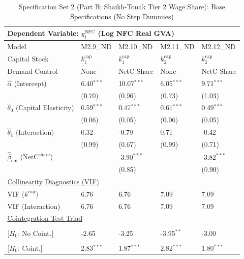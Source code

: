 \begin{table}[H]
\centering
\caption{Specification Set 2 (Part B: Shaikh-Tonak Tier 2 Wage Share): Base Specifications (No Step Dummies)}
\label{tab:spec_set_2_b_nd}
\scriptsize
\begin{tabular}{p{3.8cm}p{1.35cm}p{1.35cm}p{1.35cm}p{1.35cm}}
\toprule
\multicolumn{5}{l}{\textbf{Dependent Variable: $y_t^{\text{NFC}}$ (Log NFC Real GVA)}} \\
\midrule
Model & M2.9\_ND & M2.10\_ND & M2.11\_ND & M2.12\_ND  \\
Capital Stock & $k^{\text{cap}}_1$ & $k^{\text{cap}}_1$ & $k^{\text{cap}}_2$ & $k^{\text{cap}}_2$  \\
Demand Control & None & NetC Share & None & NetC Share  \\
\midrule
$\hat{\alpha}$ (Intercept)  & 6.40$^{***}$ & 10.07$^{***}$ & 6.05$^{***}$ & 9.71$^{***}$  \\
 & {\scriptsize (0.70)} & {\scriptsize (0.96)} & {\scriptsize (0.73)} & {\scriptsize (1.03)}  \\
[1ex]
$\hat{\theta}_0$ (Capital Elasticity)  & 0.59$^{***}$ & 0.47$^{***}$ & 0.61$^{***}$ & 0.49$^{***}$  \\
 & {\scriptsize (0.06)} & {\scriptsize (0.05)} & {\scriptsize (0.06)} & {\scriptsize (0.05)}  \\
$\hat{\theta}_1$ (Interaction)  & 0.32 & -0.79 & 0.71 & -0.42  \\
 & {\scriptsize (0.99)} & {\scriptsize (0.67)} & {\scriptsize (0.99)} & {\scriptsize (0.71)}  \\
$\hat{\beta}_{\text{cm}}$ ($\text{NetC}^{\text{share}}$)  & --- & -3.90$^{***}$ & --- & -3.82$^{***}$  \\
 &  & {\scriptsize (0.85)} &  & {\scriptsize (0.90)}  \\
\midrule
\multicolumn{5}{l}{\underline{Collinearity Diagnostics (VIF)}} \\
VIF ($k^{\text{cap}}$) & 6.76 & 6.76 & 7.09 & 7.09  \\
VIF (Interaction) & 6.76 & 6.76 & 7.09 & 7.09  \\
\midrule
\multicolumn{5}{l}{\underline{Cointegration Test Triad}} \\
\makecell[l]{Resid. ADF ($t_{\text{ADF}}$) \\ {\scriptsize [$H_0$: No Coint.]}} & -2.65 & -3.25 & -3.95$^{**}$ & -3.00  \\
\makecell[l]{Shin LM ($C_{\text{Shin}}$) \\ {\scriptsize [$H_0$: Coint.]}} & 2.83$^{***}$ & 1.87$^{***}$ & 2.82$^{***}$ & 1.80$^{***}$  \\

\end{tabular}
\end{table}
